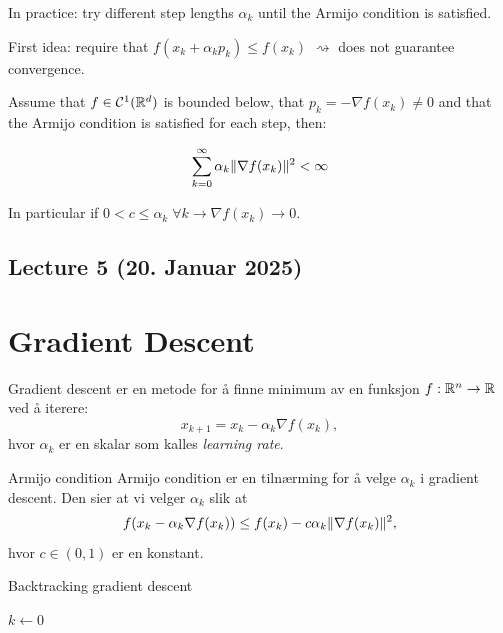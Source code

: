 In practice: try different step lengths $\alpha_k$ until the Armijo condition is satisfied.

First idea: require that $f(x_k + \alpha_k p_k) \leq f(x_k)$ $\rightsquigarrow$ does not guarantee convergence.

\begin{lemma}{}{}
    Assume that $f \in \mathcal{C}^1(\mathbb{R}^d)$ is bounded below, that $p_k = - \nabla f(x_k) \neq 0$ and that the Armijo condition is satisfied for each step, then:

    \[
        \sum_{k=0}^{\infty} \alpha_k \lVert\nabla f(x_k)\rVert^2 < \infty
    \]

    In particular if $0 < c \leq \alpha_k \; \forall k \rightarrow \nabla f(x_k) \rightarrow 0$.
\end{lemma}



\subsection{Lecture 5 (20. Januar 2025)}

\section*{Gradient Descent}


Gradient descent er en metode for å finne minimum av en funksjon $f: \mathbb{R}^n \to \mathbb{R}$ ved å iterere:
\[
    x_{k+1} = x_k - \alpha_k \nabla f(x_k),
\]
hvor $\alpha_k$ er en skalar som kalles \emph{learning rate}.

\begin{remark}{Armijo condition}{}
    Armijo condition er en tilnærming for å velge $\alpha_k$ i gradient descent. Den sier at vi velger $\alpha_k$ slik at
    \[
        f(x_k - \alpha_k \nabla f(x_k)) \leq f(x_k) - c \alpha_k \lVert\nabla f(x_k)\rVert^2,
    \]
    hvor $c \in (0, 1)$ er en konstant.
\end{remark}


\begin{algorithm}
    \caption{Backtracking gradient descent}
    \SetAlgoLined
    $k \gets 0$\;
\end{algorithm}


